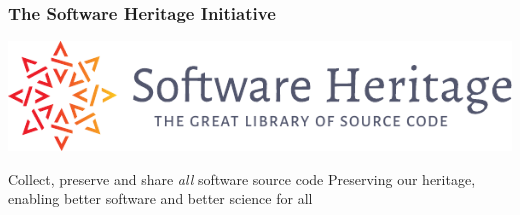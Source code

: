 \documentclass[aspectratio=169,xcolor=table]{beamer}
\begin{document}
    \begin{frame}
        \frametitle{The Software Heritage Initiative}

        \begin{center}
            \includegraphics[width=.5\linewidth]{img/SWH-logo+motto.pdf}
        \end{center}

        \begin{block}{Collect, preserve and share \emph{all} software source
            code}
            \hfill Preserving our heritage, enabling better software and better
            science for all
        \end{block}


\end{frame}
\end{document}
